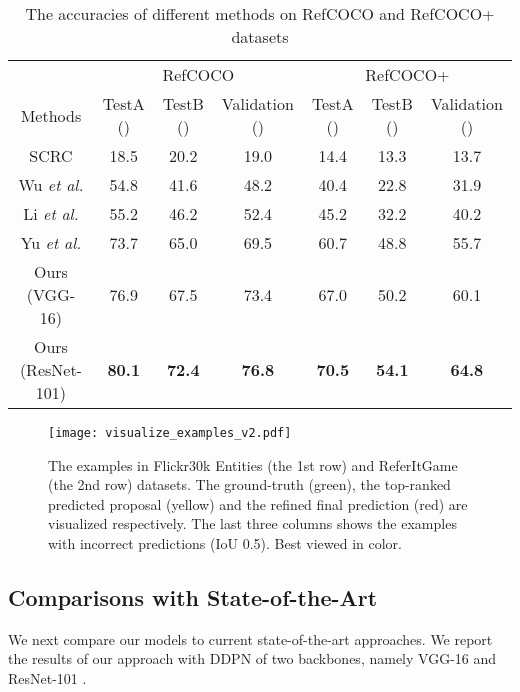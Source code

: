 \documentclass{article}
\begin{document}
\begin{table*}
\centering
\caption{The accuracies of different methods on RefCOCO and RefCOCO+ datasets}\label{table:refcoco}
\vspace{-5pt}
\small
\begin{tabular}{c|ccc|ccc}
\toprule
 & \multicolumn{3}{c|}{RefCOCO} & \multicolumn{3}{c}{RefCOCO+}\\
Methods & TestA () & TestB () & Validation () & TestA () & TestB () & Validation () \\
\midrule
SCRC \cite{hu2016natural} & 18.5 & 20.2 & 19.0 & 14.4 & 13.3 & 13.7 \\
Wu \emph{et al.} \cite{wu2017end} & 54.8 & 41.6 & 48.2 & 40.4 & 22.8 & 31.9\\
Li \emph{et al.} \cite{li2017deep} & 55.2 &  46.2 & 52.4 & 45.2 & 32.2 & 40.2 \\
Yu \emph{et al.} \cite{yu2017joint} & 73.7 &  65.0 & 69.5 & 60.7 & 48.8 & 55.7 \\
\midrule
Ours (VGG-16) & 76.9& 67.5 & 73.4& 67.0 & 50.2 & 60.1 \\
Ours (ResNet-101) & \textbf{80.1} & \textbf{72.4} & \textbf{76.8} &  \textbf{70.5} & \textbf{54.1} & \textbf{64.8} \\
\bottomrule
\end{tabular}
\vspace{-10pt}
\end{table*}

\begin{figure*}
\begin{center}
\texttt{[image: visualize\_examples\_v2.pdf]}
\vspace{-5pt}
\caption{The examples in Flickr30k Entities (the 1st row) and ReferItGame (the 2nd row) datasets. The ground-truth (green), the top-ranked predicted proposal (yellow) and the refined final prediction (red) are visualized respectively. The last three columns shows the examples with incorrect predictions (IoU  0.5). Best viewed in color.}\label{fig:visualization}
\end{center}
\vspace{-20pt}
\end{figure*}


\subsection{Comparisons with State-of-the-Art}

We next compare our models to current state-of-the-art approaches. We report the results of our approach with DDPN of two backbones, namely VGG-16 \cite{simonyan2014very} and ResNet-101 \cite{he2015deep}.
\end{document}
